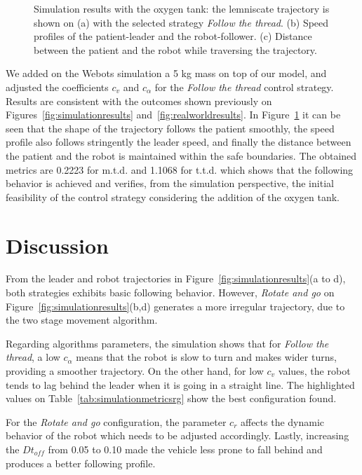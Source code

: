 \documentclass[journal]{IEEEtran}
\begin{document}
\begin{figure}
    \hspace*{-1.5em}
    \vspace*{1.1em}
  \caption{Simulation results with the oxygen tank: the lemniscate trajectory is shown on (a) with the selected strategy \textit{Follow the thread}. (b) Speed profiles of the patient-leader and the robot-follower. (c) Distance between the patient and the robot while traversing the trajectory.}
  \label{fig:validationwithtank} 
\end{figure}


We added on the Webots simulation a 5 kg mass on top of our model, and adjusted the coefficients $c_v$ and $c_{\alpha}$ for the  \textit{Follow the thread}  control strategy.  Results are consistent with the outcomes shown previously on Figures~\ref{fig:simulationresults} and~\ref{fig:realworldresults}.  In Figure~\ref{fig:validationwithtank} it can be seen that the shape of the trajectory follows the patient smoothly, the speed profile also follows stringently the leader speed, and finally the distance between the patient and the robot is maintained within the safe boundaries.  The obtained metrics are 0.2223 for m.t.d. and 1.1068 for t.t.d. which shows that the following behavior is achieved and verifies, from the simulation perspective, the initial feasibility of the control strategy considering the addition of the oxygen tank.

\section{Discussion}
\label{discussion}

From the leader and robot trajectories in Figure~\ref{fig:simulationresults}(a to d), both strategies exhibits basic following behavior.  However, \textit{Rotate and go} on Figure~\ref{fig:simulationresults}(b,d) generates a more irregular trajectory, due to the two stage movement algorithm.   

Regarding algorithms parameters, the simulation shows that for \textit{Follow the thread}, a low $c_{\alpha}$  means that the robot is slow to turn and makes wider turns, providing a smoother trajectory.  On the other hand, for low $c_v$ values, the robot tends to lag behind the leader when it is going in a straight line.  The highlighted values on Table~\ref{tab:simulationmetricsrg} show the best configuration found.  

For the \textit{Rotate and go} configuration, the parameter $c_r$ affects the dynamic behavior of the robot which needs to be adjusted accordingly.  Lastly, increasing the $Dt_{off}$ from 0.05 to 0.10 made the vehicle less prone to fall behind and produces a better following profile.
\end{document}
